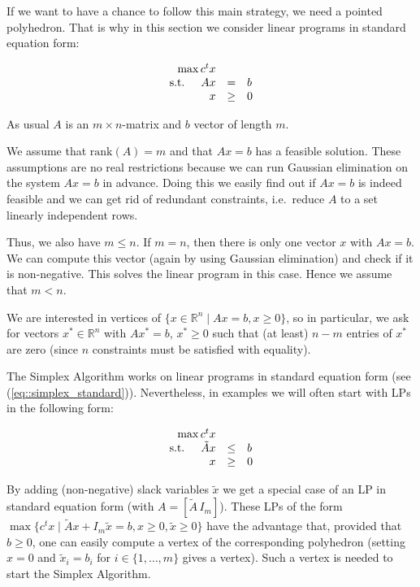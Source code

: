 \documentclass[12pt, showidx, twoside]{article}
\def\R{\mathbb{R}}
\begin{document}
{{{If we want to have a chance to follow this main strategy, we need a pointed polyhedron.
That is why in this section we consider linear programs in standard equation form:

\begin{equation}\label{eq::simplex_standard}
\begin{array}{rcl}
 \max c^t x & & \\
 \mbox{s.t. \quad} Ax & = & b\\
 x & \geq & 0
\end{array}
\end{equation}

As usual $A$ is an $m \times n$-matrix and $b$ vector of length $m$.

We assume that $\mbox{rank}(A) = m$ and that $Ax=b$ has a feasible
solution. These assumptions are no real restrictions because
we can run Gaussian elimination{}
on the system $Ax=b$ in advance.
Doing this we easily find out if $Ax=b$ is indeed feasible and
we can get rid of redundant constraints, i.e.\ reduce $A$ to 
a set linearly independent rows.

Thus, we also have $m \leq n$. If $m = n$, then there is only
one vector $x$ with $Ax=b$. We can compute this vector (again by
using Gaussian elimination) and check if it is non-negative. 
This solves the linear program in this case. 
Hence we assume that $m < n$.

We are interested in vertices of $\{x \in \R^n \mid Ax=b, x \geq 0\}$, so
in particular, we ask for vectors $x^*\in \R^n$ with  $Ax^* = b$, $x^* \geq 0$
such that (at least) $n-m$ entries of $x^*$ are zero (since $n$ constraints must
be satisfied with equality).

The {\sc Simplex Algorithm} works on linear programs in standard
equation form (see (\ref{eq::simplex_standard})).
Nevertheless, in examples we will often start with LPs in the following
form:

\begin{equation}\label{eq::simplex_standard_ineq}
\begin{array}{rcl}
 \max c^t x & & \\
 \mbox{s.t. \quad} \tilde A x & \leq & b\\
 x & \geq & 0
\end{array}
\end{equation}

By adding (non-negative) slack variables $\tilde x$ we get a special case
of an LP in standard equation form (with $A = [\tilde A \, I_m]$). These LPs
of the form 
$\max \{ c^tx \mid \tilde Ax + I_m \tilde x = b, x\geq 0, \tilde x \geq 0\}$
have the advantage that, provided that $b \geq 0$, %
one can easily compute a vertex of the corresponding polyhedron
(setting $x=0$ and $\tilde x_i = b_i$ for $i \in \{1,\dots,m\}$ gives a vertex).
Such a vertex is needed to start the {\sc Simplex Algorithm}.


}}}
\end{document}
